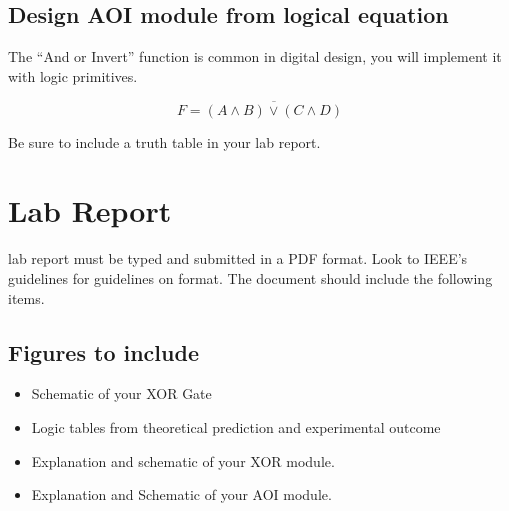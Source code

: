 \documentclass[12pt,journal]{IEEEtran}
\begin{document}
      \subsection{Design AOI module from logical equation} 
      The ``And or Invert'' function is common in digital design, you will implement it with logic primitives. 

      \begin{displaymath}
        F = \overline{(A \wedge B) \vee (C \wedge D)}
      \end{displaymath}

      Be sure to include a truth table in your lab report.
      \clearpage

  \section{Lab Report}
     lab report must be typed and submitted in a PDF format. Look to IEEE's guidelines for  guidelines on format. The document should include the following items.
    
    \subsection{Figures to include}
    \begin{itemize}
      \item Schematic of your XOR Gate
      \item Logic tables from theoretical prediction and experimental outcome
      \item Explanation and schematic of your XOR module.
      \item Explanation and Schematic of your AOI module.
    \end{itemize}
\end{document}

